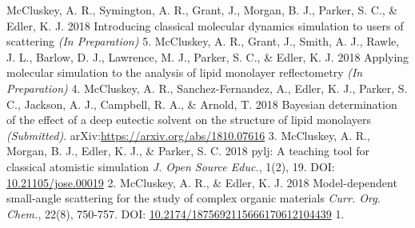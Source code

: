 \begin{cvpubys}
  \cvpuby
    {McCluskey, A. R., Symington, A. R., Grant, J., Morgan, B. J., Parker, S. C., \& Edler, K. J.}
    {2018}
    {Introducing classical molecular dynamics simulation to users of scattering}
    {\emph{(In Preparation)}}
    {5.}
  \cvpuby
    {McCluskey, A. R., Grant, J., Smith, A. J., Rawle, J. L., Barlow, D. J., Lawrence, M. J., Parker, S. C., \& Edler, K. J.}
    {2018}
    {Applying molecular simulation to the analysis of lipid monolayer reflectometry}
    {\emph{(In Preparation)}}
    {4.}
  \cvpuby
  	{McCluskey, A. R., Sanchez-Fernandez, A., Edler, K. J., Parker, S. C., Jackson, A. J., Campbell, R. A., \& Arnold, T.}
    {2018}
    {Bayesian determination of the effect of a deep eutectic solvent on the structure of lipid monolayers}
    {\emph{(Submitted)}. arXiv:\href{1810.07616}{https://arxiv.org/abs/1810.07616}}
    {3.}
  \cvpuby
  	{McCluskey, A. R., Morgan, B. J., Edler, K. J., \& Parker, S. C.}
  	{2018}
  	{pylj: A teaching tool for classical atomistic simulation}
  	{\emph{J. Open Source Educ.}, 1(2), 19. DOI: \href{http://doi.org/10.21105/jose.00019}{10.21105/jose.00019}}
  	{2.}
  \cvpuby
    {McCluskey, A. R., \& Edler, K. J.}
    {2018}
    {Model-dependent small-angle scattering for the study of complex organic materials}
	  {\emph{Curr. Org. Chem.}, 22(8), 750-757. DOI: \href{http://doi.org/10.2174/1875692115666170612104439}{10.2174/1875692115666170612104439}}
    {1.}
\end{cvpubys}
